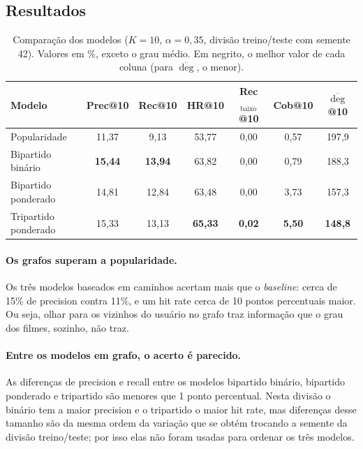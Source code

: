 \documentclass[12pt,a4paper]{article}
\theoremstyle{definition}
\begin{document}
\subsection{Resultados}\label{sec:resultados}

\begin{table}[ht]
\centering
\small
\begin{tabular}{lcccccc}
\toprule
Modelo & Prec@10 & Rec@10 & HR@10 & Rec$_{\text{baixo}}$@10 & Cob@10 & $\overline{\deg}$@10 \\
\midrule
Popularidade          & 11{,}37 &  9{,}13 & 53{,}77 & 0{,}00 & 0{,}57 & 197{,}9 \\
Bipartido binário     & \textbf{15{,}44} & \textbf{13{,}94} & 63{,}82 & 0{,}00 & 0{,}79 & 188{,}3 \\
Bipartido ponderado   & 14{,}81 & 12{,}84 & 63{,}48 & 0{,}00 & 3{,}73 & 157{,}3 \\
Tripartido ponderado  & 15{,}33 & 13{,}13 & \textbf{65{,}33} & \textbf{0{,}02} & \textbf{5{,}50} & \textbf{148{,}8} \\
\bottomrule
\end{tabular}
\caption{Comparação dos modelos ($K = 10$, $\alpha = 0{,}35$, divisão
treino/teste com semente 42). Valores em \%, exceto o grau médio. Em
negrito, o melhor valor de cada coluna (para $\overline{\deg}$, o menor).}
\label{tab:avaliacao}
\end{table}

\paragraph{Os grafos superam a popularidade.}
Os três modelos baseados em caminhos acertam mais que o \emph{baseline}:
cerca de 15\% de precision contra 11\%, e um hit rate cerca de 10 pontos
percentuais maior. Ou seja, olhar para os vizinhos do usuário no grafo
traz informação que o grau dos filmes, sozinho, não traz.

\paragraph{Entre os modelos em grafo, o acerto é parecido.}
As diferenças de precision e recall entre os modelos bipartido binário,
bipartido ponderado e tripartido são menores que 1 ponto percentual. Nesta
divisão o binário tem a maior precision e o tripartido o maior hit rate,
mas diferenças desse tamanho são da mesma ordem da variação que se obtém
trocando a semente da divisão treino/teste; por isso elas não foram usadas para
ordenar os três modelos.
\end{document}
